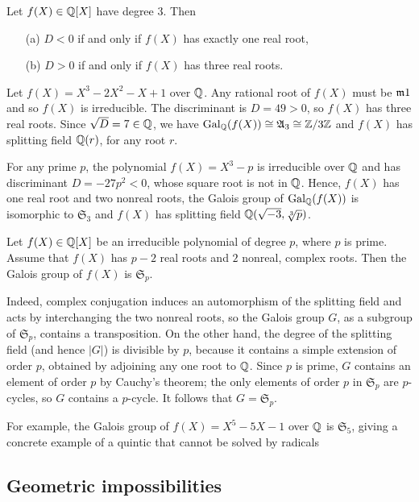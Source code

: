 \begin{proposition}
Let $f(X)\in\mathbb{Q}[X]$ have degree $3$. Then
\begin{itemize}
\item[(a)] $D<0$ if and only if $f(X)$ has exactly one real root,
\item[(b)] $D>0$ if and only if $f(X)$ has three real roots.
\end{itemize}
\end{proposition}
\begin{example}
Let $f(X)=X^3-2X^2-X+1$ over $\mathbb{Q}$. Any rational root of $f(X)$ must be $\mathfrak{m} 1$ and so $f(X)$ is irreducible. The discriminant is $D=49>0$, so $f(X)$ has three real roots. Since $\sqrt{D}=7\in\mathbb{Q}$, we have $\mathrm{Gal}_{\mathbb{Q}}(f(X))\cong\mathfrak{A}_3\cong\mathbb{Z}/3\mathbb{Z}$ and $f(X)$ has splitting field $\mathbb{Q}(r)$, for any root $r$.
\end{example}
\begin{example}
For any prime $p$, the polynomial $f(X)=X^3-p$ is irreducible over $\mathbb{Q}$ and has discriminant $D=-27p^2<0$, whose square root is not in $\mathbb{Q}$. Hence, $f(X)$ has one real root and two nonreal roots, the Galois group of $\mathrm{Gal}_{\mathbb{Q}}(f(X))$ is isomorphic to $\mathfrak{S}_3$ and $f(X)$ has splitting field $\mathbb{Q}(\sqrt{-3},\sqrt[3]{p})$.
\end{example}
\begin{example}\label{Galois group is S_n eg}
Let $f(X)\in\mathbb{Q}[X]$ be an irreducible polynomial of degree $p$, where $p$ is prime. Assume that $f(X)$ has $p-2$ real roots and $2$ nonreal, complex roots. Then the Galois group of $f(X)$ is $\mathfrak{S}_p$.\par
Indeed, complex conjugation induces an automorphism of the splitting field and acts by interchanging the two nonreal roots, so the Galois group $G$, as a subgroup of $\mathfrak{S}_p$, contains a transposition. On the other hand, the degree of the splitting field (and hence $|G|$) is divisible by $p$, because it contains a simple extension of order $p$, obtained by adjoining any one root to $\mathbb{Q}$. Since $p$ is prime, $G$ contains an element of order $p$ by Cauchy's theorem; the only elements of order $p$ in $\mathfrak{S}_p$ are $p$-cycles, so $G$ contains a $p$-cycle. It follows that $G=\mathfrak{S}_p$.\par
For example, the Galois group of $f(X)=X^5-5X-1$ over $\mathbb{Q}$ is $\mathfrak{S}_5$, giving a concrete example of a quintic that cannot be solved by radicals
\end{example}
\subsection{Geometric impossibilities}
